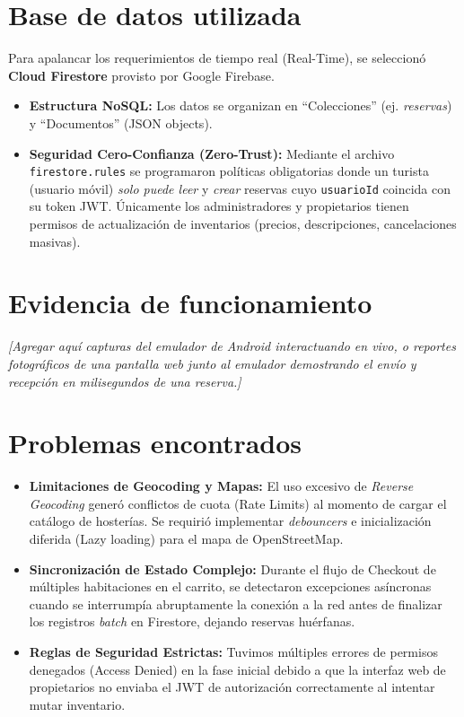 \documentclass{article}
\begin{document}
\section{Base de datos utilizada}
Para apalancar los requerimientos de tiempo real (Real-Time), se seleccionó \textbf{Cloud Firestore} provisto por Google Firebase. 
\begin{itemize}[label=\small\color{verdeO}$\blacksquare$]
    \item \textbf{Estructura NoSQL:} Los datos se organizan en ``Colecciones'' (ej. \textit{reservas}) y ``Documentos'' (JSON objects).
    \item \textbf{Seguridad Cero-Confianza (Zero-Trust):} Mediante el archivo \texttt{firestore.rules} se programaron políticas obligatorias donde un turista (usuario móvil) \textit{solo puede leer} y \textit{crear} reservas cuyo \texttt{usuarioId} coincida con su token JWT. Únicamente los administradores y propietarios tienen permisos de actualización de inventarios (precios, descripciones, cancelaciones masivas).
\end{itemize}

\section{Evidencia de funcionamiento}
\textit{[Agregar aquí capturas del emulador de Android interactuando en vivo, o reportes fotográficos de una pantalla web junto al emulador demostrando el envío y recepción en milisegundos de una reserva.]}

\section{Problemas encontrados}
\begin{itemize}[label=\small\color{verdeO}$\blacksquare$]
    \item \textbf{Limitaciones de Geocoding y Mapas:} El uso excesivo de \textit{Reverse Geocoding} generó conflictos de cuota (Rate Limits) al momento de cargar el catálogo de hosterías. Se requirió implementar \textit{debouncers} e inicialización diferida (Lazy loading) para el mapa de OpenStreetMap.
    \item \textbf{Sincronización de Estado Complejo:} Durante el flujo de Checkout de múltiples habitaciones en el carrito, se detectaron excepciones asíncronas cuando se interrumpía abruptamente la conexión a la red antes de finalizar los registros \textit{batch} en Firestore, dejando reservas huérfanas. 
    \item \textbf{Reglas de Seguridad Estrictas:} Tuvimos múltiples errores de permisos denegados (Access Denied) en la fase inicial debido a que la interfaz web de propietarios no enviaba el JWT de autorización correctamente al intentar mutar inventario.
\end{itemize}
\end{document}
